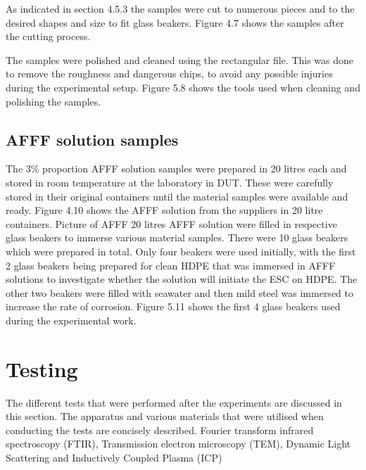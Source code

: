 \documentclass[12pt]{report}
\begin{document}
 

As indicated in section 4.5.3 the samples were cut to numerous pieces and to the desired shapes and size to fit glass beakers. Figure 4.7 shows the samples after the cutting process. 
 

The samples were polished and cleaned using the rectangular file. This was done to remove the roughness and dangerous chips, to avoid any possible injuries during the experimental setup. Figure 5.8 shows the tools used when cleaning and polishing the samples.
 

\subsection{AFFF solution samples}
The 3\% proportion AFFF solution samples were prepared in 20 litres each and stored in room temperature at the laboratory in DUT. These were carefully stored in their original containers until the material samples were available and ready. Figure 4.10 shows the AFFF solution from the suppliers in 20 litre containers.
Picture of AFFF 20 litres
AFFF solution were filled in respective glass beakers to immerse various material samples. There were 10 glass beakers which were prepared in total. Only four beakers were used initially, with the first 2 glass beakers being prepared for clean HDPE that was immersed in AFFF solutions to investigate whether the solution will initiate the ESC on HDPE. The other two beakers were filled with seawater and then mild steel was immersed to increase the rate of corrosion. Figure 5.11 shows the first 4 glass beakers used during the experimental work.
 
 
 

\section{Testing} 
The different tests that were performed after the experiments are discussed in this section. The apparatus and various materials that were utilised when conducting the tests are concisely described. 
Fourier transform infrared spectroscopy (FTIR), Transmission electron microscopy (TEM), Dynamic Light Scattering and Inductively Coupled Plasma (ICP)
\end{document}
